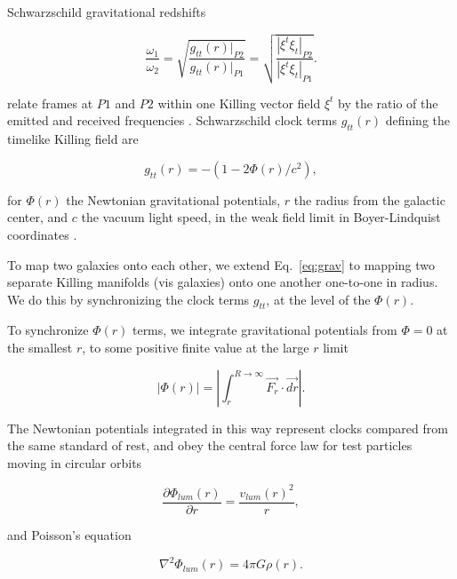 \documentclass[reprint,%
 amsmath,amssymb,
 aps,
]{revtex4-1}
\begin{document}
 Schwarzschild gravitational redshifts  
 
     \begin{equation}
       \frac{\omega_1}{\omega_2}  =\sqrt{\frac{g_{tt}(r)|_{P2}}{g_{tt}(r)|_{P1}}} =\sqrt{\frac{|\xi^t\xi_{t}|_{P2}}{|\xi^t\xi_{t}|_{P1}}}. 
      \label{eq:grav}
    \end{equation}
    
  relate    frames   at   $P1$ and $P2$ within one  Killing vector field $\xi^t$ by the ratio of the emitted and received frequencies \cite{Wald}.  
  Schwarzschild clock  terms $g_{tt}(r)$ defining the timelike Killing field      are 
   
  \begin{equation}
      g_{tt}(r)= -( 1 - 2\Phi(r)/ c^2), 
      \label{clocktime}
  \end{equation} 
  
for $\Phi (r)$ 
the Newtonian  gravitational potentials, $r$  the radius from the galactic center, and $c$   the vacuum light speed, in the weak field limit  in Boyer-Lindquist coordinates \cite{Hartle}. 
  
To map two galaxies onto each other, we extend   Eq.~\ref{eq:grav} to   mapping two separate Killing manifolds (vis galaxies) onto one another  one-to-one in radius. We do this by synchronizing the 
 clock terms  $g_{tt}$,  at the level of  the   $\Phi (r)$. 
 
 To synchronize $\Phi (r)$ terms, we   integrate    gravitational potentials from   $\Phi = 0$ at the  smallest $r$,  to some positive finite value at the large $r$ limit
    
  
 
    \begin{equation}
     | \Phi  (r) |= \left| \int^{R\to \infty}_{r} \vec{F_r}\cdot\vec{dr} \right|.
      \label{eq:Newt2}
      \end{equation}
 
   The Newtonian potentials integrated in this way  represent clocks compared from the same standard of rest, and   obey the central force law for test particles moving in circular orbits

\begin{equation}
 \frac{\partial \Phi_{lum}(r)}{\partial r}    =\frac{v_{lum}(r)^2}{r},  
    \label{zoochance1}
\end{equation}

 and Poisson's equation
 
\begin{equation}
\nabla^2 \Phi_{lum} (r) = 4\pi G \rho (r).   
    \label{whatsgood}
\end{equation}
\end{document}
